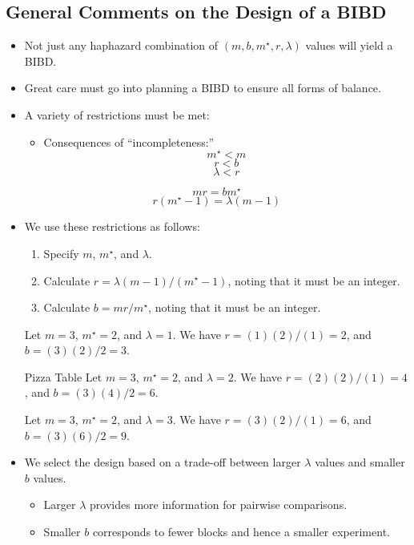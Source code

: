 \subsection{General Comments on the Design of a BIBD}
\begin{itemize}
      \item Not just any haphazard combination of $ (m,b,m^\star,r,\lambda) $ values will yield a BIBD\@.
      \item Great care must go into planning a BIBD to ensure all forms of balance.
      \item A variety of restrictions must be met:
            \begin{itemize}
                  \item Consequences of ``incompleteness:''
                        \[ m^\star<m \]
                        \[ r<b \]
                        \[ \lambda<r \]
            \end{itemize}
            \[ mr=bm^\star \]
            \[ r(m^\star-1)=\lambda(m-1) \]
      \item We use these restrictions as follows:
            \begin{enumerate}
                  \item Specify $ m $, $ m^\star $, and $ \lambda $.
                  \item Calculate $ r=\lambda(m-1)/(m^\star-1) $, noting that it must be an integer.
                  \item Calculate $ b=mr/m^\star $, noting that it must be an integer.
            \end{enumerate}
            \begin{Example}{}{}
                  Let $ m=3 $, $ m^\star=2 $, and $ \lambda=1 $. We have
                  $ r=(1)(2)/(1) =2 $, and
                  $ b=(3)(2)/2 =3 $.
            \end{Example}
            \begin{Example}{Pizza Table}{}
                  Let $ m=3 $, $ m^\star=2 $, and $ \lambda=2 $. We have
                  $ r=(2)(2)/(1) =4 $, and
                  $ b=(3)(4)/2 =6 $.
            \end{Example}
            \begin{Example}{}{}
                  Let $ m=3 $, $ m^\star=2 $, and $ \lambda=3 $. We have
                  $ r=(3)(2)/(1) =6 $, and
                  $ b=(3)(6)/2 =9 $.
            \end{Example}
      \item We select the design based on a trade-off between larger $ \lambda $ values and smaller $ b $ values.
            \begin{itemize}
                  \item Larger $ \lambda $ provides more information for pairwise comparisons.
                  \item Smaller $ b $ corresponds to fewer blocks and hence a smaller experiment.
            \end{itemize}
\end{itemize}
